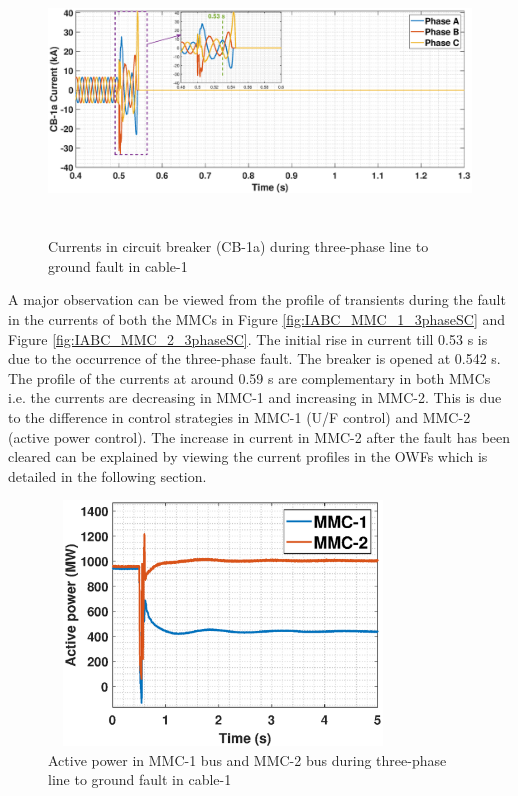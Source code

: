 \begin{figure}[H]
\hspace*{-1.2cm}
    \includegraphics[height = 7cm,width = 19.5cm]{Diagrams/Chapter_5/IABC_CB_3phaseSC_new_4.eps}
    \caption{Currents in circuit breaker (CB-1a) during three-phase line to ground fault in cable-1}
    \label{Circuit_breaker_3phasefault}
\end{figure}

A major observation can be viewed from the profile of transients during the fault in the currents of both the \gls{MMC}s in Figure \ref{fig:IABC_MMC_1_3phaseSC} and Figure \ref{fig:IABC_MMC_2_3phaseSC}. The initial rise in current till 0.53 s is due to the occurrence of the three-phase fault. The breaker is opened at 0.542 s. The profile of the currents at around 0.59 s are complementary in both \gls{MMC}s i.e. the currents are decreasing in \gls{MMC}-1 and increasing in \gls{MMC}-2. This is due to the difference in control strategies in \gls{MMC}-1 (U/F control) and \gls{MMC}-2 (active power control). The increase in current in \gls{MMC}-2 after the fault has been cleared can be explained by viewing the current profiles in the \gls{OWF}s which is detailed in the following section.

\begin{figure}[H]
\centering
    \includegraphics[height = 6.5cm,width = 9.25cm]{Diagrams/Chapter_5/P_MMC_1_2_3phaseSC.eps}
    \caption{Active power in MMC-1 bus and MMC-2 bus during three-phase line to ground fault in cable-1}
    \label{17_3phaseSC}
\end{figure}

